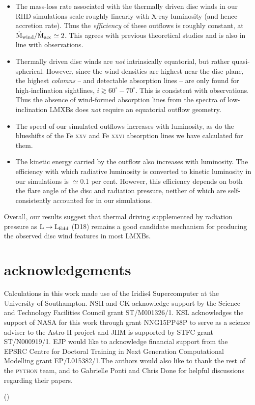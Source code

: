 \documentclass[a4paper,fleqn,usenatbib]{mnras}
\begin{document}
\begin{itemize}
\item{The mass-loss rate associated with the thermally driven disc
  winds in our RHD simulations scale roughly linearly with X-ray
  luminosity (and hence accretion rate). Thus the {\em efficiency} of
  these outflows is roughly constant, at
  $\dot{\rm{M}}_{\rm{wind}}/\dot{\rm{M}}_{\rm{acc}} \simeq 2$. This
  agrees with previous theoretical studies and is also in line with
  observations.}
\item{Thermally driven disc winds are {\em not} intrinsically
  equatorial, but rather quasi-spherical. However, since the wind
  densities are highest near the disc plane, the highest {\em columns}
  -- and detectable absorption lines -- are only found for
  high-inclination sightlines, $i \gtrsim 60^\circ - 70^\circ$. This
  is consistent with observations. Thus the absence of wind-formed
  absorption lines from the spectra of low-inclination LMXBs does {\em
    not} require an equatorial outflow geometry.}
\item{The speed of our simulated outflows increases with luminosity, as do the
  blueshifts of the Fe \textsc{xxv} and Fe \textsc{xxvi} absorption
  lines we have calculated for them.}
\item{The kinetic energy carried by the outflow also increases with
  luminosity. The efficiency with which radiative
  luminosity is converted to kinetic luminosity in our simulations is
  $\simeq$0.1 per cent. However, this efficiency depends on both the flare
  angle of the disc and radiation pressure, neither of
  which are self-consistently accounted for in our simulations.}
\end{itemize}
Overall, our results suggest that thermal driving supplemented by 
radiation pressure as $\rm{L\rightarrow L_{Edd}}$ 
(D18) remains 
a good  candidate mechanism for producing the observed disc wind
features in most LMXBs.


\section{acknowledgements}
Calculations in this work made use of the Iridis4 Supercomputer at the
University of Southampton. NSH and CK  acknowledge support by the
Science and Technology Facilities Council grant ST/M001326/1.  
KSL acknowledges the support of NASA for this work through grant 
NNG15PP48P to serve as a 
science adviser to the Astro-H project and JHM is supported by STFC 
grant ST/N000919/1. EJP would like to acknowledge financial support from 
the EPSRC Centre for Doctoral Training in Next Generation Computational 
Modelling grant EP/L015382/1.The authors would
also like to thank the rest of the \textsc{python} team, and to Gabrielle Ponti 
and Chris Done for helpful discussions regarding their papers.





()
\label{lastpage}

\bsp	%
\end{document}
